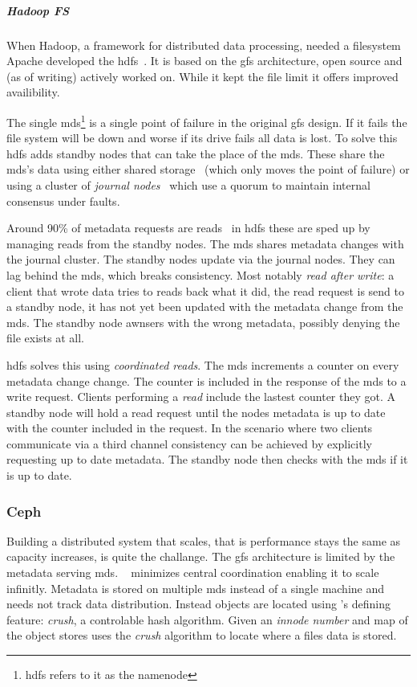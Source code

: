 \subparagraph*{Hadoop FS}
When Hadoop, a framework for distributed data processing, needed a filesystem Apache developed the \ac{hdfs}~\cite{hdfs}. It is based on the \ac{gfs} architecture, open source and (as of writing) actively worked on. While it kept the file limit it offers improved availibility.

The single \ac{mds}\footnote{\ac{hdfs} refers to it as the namenode} is a single point of failure in the original \ac{gfs} design. If it fails the file system will be down and worse if its drive fails all data is lost. To solve this \ac{hdfs} adds standby nodes that can take the place of the \ac{mds}. These share the \ac{mds}'s data using either shared storage~\cite{hdfs_ha_nfs} (which only moves the point of failure) or using a cluster of \textit{journal nodes}~\cite{hdfs_ha_q} which use a quorum to maintain internal consensus under faults. 

Around 90\% of metadata requests are reads~\cite{hdfs_ha_reads} in \ac{hdfs} these are sped up by managing reads from the standby nodes. The \ac{mds} shares metadata changes with the journal cluster. The standby nodes update via the journal nodes. They can lag behind the \ac{mds}, which breaks consistency. Most notably \textit{read after write}: a client that wrote data tries to reads back what it did, the read request is send to a standby node, it has not yet been updated with the metadata change from the \ac{mds}. The standby node awnsers with the wrong metadata, possibly denying the file exists at all. 

\ac{hdfs} solves this using \textit{coordinated reads}. The \ac{mds} increments a counter on every metadata change change. The counter is included in the response of the \ac{mds} to a write request. Clients performing a \textit{read} include the lastest counter they got. A standby node will hold a read request until the nodes metadata is up to date with the counter included in the request. In the scenario where two clients communicate via a third channel consistency can be achieved by explicitly requesting up to date metadata. The standby node then checks with the \ac{mds} if it is up to date.

\subsubsection*{Ceph}
Building a distributed system that scales, that is performance stays the same as capacity increases, is quite the challange. The \ac{gfs} architecture is limited by the metadata serving \acf{mds}. \ceph{}~\cite{ceph} minimizes central coordination enabling it to scale infinitly. Metadata is stored on multiple \ac{mds} instead of a single machine and needs not track data distribution. Instead objects are located using \ceph{}'s defining feature: \emph{\ac{crush}}, a controlable hash algorithm. Given an \textit{innode number} and map of the object stores \ceph{} uses the \emph{\ac{crush}} algorithm to locate where a files data is stored. 

